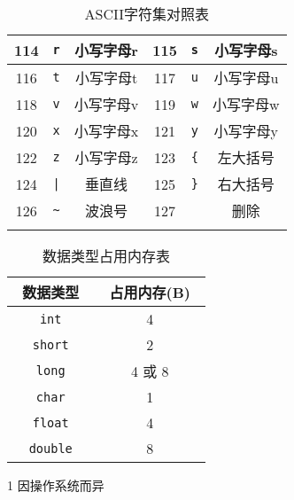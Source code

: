 \begin{longtable}{|c|c|c|c|c|c|}
        \hline \rule{0pt}{15pt}
        114  & 	\texttt{r}         & 小写字母r       	& 115  & 	\texttt{s}         & 小写字母s       	\\
        \hline \rule{0pt}{15pt}
        116  & 	\texttt{t}         & 小写字母t       	& 117  & 	\texttt{u}         & 小写字母u       	\\
        \hline \rule{0pt}{15pt}
        118  & 	\texttt{v}         & 小写字母v       	& 119  & 	\texttt{w}         & 小写字母w       	\\
        \hline \rule{0pt}{15pt}
        120  & 	\texttt{x}         & 小写字母x       	& 121  & 	\texttt{y}         & 小写字母y       	\\
        \hline \rule{0pt}{15pt}
        122  & 	\texttt{z}         & 小写字母z       	& 123  & \texttt{\{}         & 左大括号        	\\
        \hline \rule{0pt}{15pt}
        124  & \texttt{|}         & 垂直线           	& 125  & \texttt{\}}         & 右大括号        	\\
        \hline \rule{0pt}{15pt}
        126  & \texttt{\~{}}         & 波浪号           	& 127  &           & 删除           	\\
        \hline
        \caption{ASCII字符集对照表} \label{ASCII字符集对照表}
    \end{longtable}

    \begin{table}[htbp]
        \centering
        \renewcommand\arraystretch{1.5}
        \begin{threeparttable}
            \begin{tabular}{|c|c|} 
                \hline
                ~数据类型~    & ~占用内存(B)~   \\
                \hline \hline
                \texttt{int}         & 4             \\
                \hline
                \texttt{short}       & 2             \\
                \hline
                \texttt{long}        & 4 或 8\tnote{1} \\
                \hline
                \texttt{char}        & 1             \\
                \hline
                \texttt{float}       & 4             \\
                \hline
                \texttt{double}      & 8             \\
                \hline
            \end{tabular} 
            \begin{tablenotes}
                \item[1] 因操作系统而异
            \end{tablenotes}
            \caption{数据类型占用内存表} \label{数据类型占用内存表}
        \end{threeparttable}
    \end{table} 

